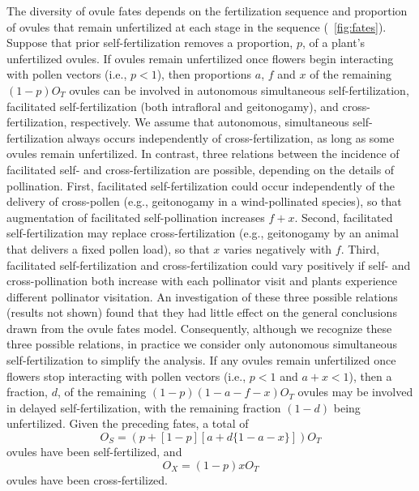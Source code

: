 \documentclass[letterpaper,titlepage]{scrartcl}
\begin{document}
The diversity of ovule fates depends on the fertilization sequence and
proportion of ovules that remain unfertilized at each stage in the
sequence ({\fref}~\ref{fig:fates}). Suppose that prior
self-fertilization removes a proportion, $p$, of a plant's
unfertilized ovules. If ovules remain unfertilized once flowers begin
interacting with pollen vectors (i.e., $p<1$), then proportions $a$,
$f$ and $x$ of the remaining $(1 - p)O_{T}$ ovules can be involved in
autonomous simultaneous self-fertilization, facilitated
self-fertilization (both intrafloral and geitonogamy), and
cross-fertilization, respectively. We assume that autonomous,
simultaneous self-fertilization always occurs independently of
cross-fertilization, as long as some ovules remain unfertilized. In
contrast, three relations between the incidence of facilitated self-
and cross-fertilization are possible, depending on the details of
pollination. First, facilitated self-fertilization could occur
independently of the delivery of cross-pollen (e.g., geitonogamy in a
wind-pollinated species), so that augmentation of facilitated
self-pollination increases $f+x$. Second, facilitated
self-fertilization may replace cross-fertilization (e.g., geitonogamy
by an animal that delivers a fixed pollen load), so that $x$ varies
negatively with $f$. Third, facilitated self-fertilization and
cross-fertilization could vary positively if self- and
cross-pollination both increase with each pollinator visit and plants
experience different pollinator visitation.  An investigation of these
three possible relations (results not shown) found that they had
little effect on the general conclusions drawn from the ovule fates
model. Consequently, although we recognize these three possible
relations, in practice we consider only autonomous simultaneous
self-fertilization to simplify the analysis. If any ovules remain
unfertilized once flowers stop interacting with pollen vectors (i.e.,
$p<1$ and $a+x<1$), then a fraction, $d$, of the remaining
$(1-p)(1-a-f-x)O_{T}$ ovules may be involved in delayed
self-fertilization, with the remaining fraction $(1-d)$ being
unfertilized. Given the preceding fates, a total of
\begin{equation}\label{eq:os}
  O_{S}=(p + [1 - p][a + d\{1 - a - x\}])O_{T}
\end{equation}
ovules have been self-fertilized, and
\begin{equation}\label{eq:ox}
  O_{X}=(1 - p)xO_{T}
\end{equation}
ovules have been cross-fertilized.
\end{document}
